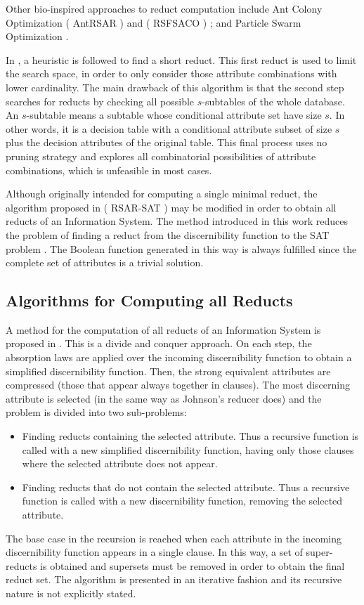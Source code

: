 \documentclass[citenumber]{llncs}
\makeatletter
\newcommand{\setword}[2]{%
  \phantomsection
  #1\def\@currentlabel{\unexpanded{#1}}\label{#2}%
}
\makeatother
\begin{document}
  Other bio-inspired approaches to reduct computation include Ant Colony Optimization (\setword{AntRSAR}{AntRSAR}) \cite{Jensen03} and (\setword{RSFSACO}{RSFSACO}) \cite{Chen10}; and Particle Swarm Optimization \cite{Wang07}.
    
  In \cite{Lin04}, a heuristic is followed to find a short reduct. This first reduct is used to limit the search
  space, in order to only consider those attribute combinations with lower cardinality. 
  The main drawback of this algorithm is that the second step searches for reducts by checking all possible 
  $s$-subtables of the whole database. An $s$-subtable means a subtable whose conditional attribute set have 
  size $s$. In other words, it is a decision table with a conditional attribute subset of size $s$ plus the decision
  attributes of the original table. This final process uses no pruning strategy and explores all combinatorial
  possibilities of attribute combinations, which is unfeasible in most cases.
  
  Although originally intended for computing a single minimal reduct, the algorithm proposed in \cite{Jensen14}  (\setword{RSAR-SAT}{RSARSAT}) may be modified in order to obtain all reducts of an Information System. The method introduced in this work reduces the problem of finding a reduct from the discernibility function to the SAT problem \cite{Davis62}. The Boolean function generated in this way is always fulfilled since the complete set of attributes is a trivial solution.
  
  \subsection{Algorithms for Computing all Reducts}
    A method for the computation of all reducts of an Information System is proposed in \cite{Starzyk99,Starzyk00}. This is a divide and conquer approach. On each step, the absorption laws are applied over the incoming discernibility function to obtain a simplified discernibility function. Then, the strong equivalent attributes are compressed (those that appear always together in clauses). The most discerning attribute is selected (in the same way as Johnson's reducer does) and the problem is divided into two sub-problems: 
    \begin{itemize}
    \item Finding reducts containing the selected attribute. Thus a recursive function is called with a new simplified discernibility function, having only those clauses where the selected attribute does not appear.
    \item Finding reducts that do not contain the selected attribute. Thus a recursive function is called with a new 
    discernibility function, removing the selected attribute.
    \end{itemize}
    The base case in the recursion is reached when each attribute in the incoming discernibility function appears in a single clause. In this way, a set of super-reducts is obtained and supersets must be removed in order to obtain the final reduct set. The algorithm is presented in an iterative fashion and its recursive nature is not explicitly stated.
    
\end{document}
